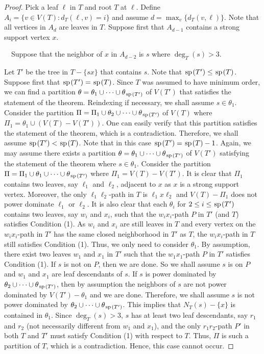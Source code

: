 \documentclass[11pt]{article}
\newcommand{\spider}{\hskip1pt \textrm{sp} \hskip1pt}
\begin{document}
\begin{proof}
Pick a leaf $\ell$ in $T$ and root $T$ at $\ell$. Define $A_i = \{v\in V(T): d_T(\ell, v) = i\}$ and assume $d= \max_v\{d_T(v, \ell)\}$. Note that all vertices in $A_d$ are leaves in $T$. Suppose first that $A_{d-1}$ contains a strong support vertex $x$.

\medskip

 \ \ Suppose that the neighbor of $x$ in $A_{d-2}$ is $s$ where $\deg_T(s) >3$.

\medskip

 Let $T'$ be the tree in $T- \{sx\}$ that contains $s$.  Note that $\spider(T') \le \spider (T)$. Suppose first that $\spider(T') = \spider(T)$. Since $T$ was assumed to have minimum order, we can find a partition $\theta=\theta_1\cup \cdots \cup \theta_{\spider(T')}$ of $V(T')$ that satisfies the statement of the theorem. Reindexing if necessary, we shall assume $s \in \theta_1$. Consider the partition $\Pi = \Pi_1 \cup \theta_2 \cup \cdots \cup \theta_{\spider(T')}$ of $V(T)$ where $\Pi_1 = \theta_1 \cup (V(T)- V(T'))$. One can easily verify that this partition satisfies the statement of the theorem, which is a contradiction. Therefore, we shall assume $\spider(T') < \spider(T)$. Note that in this case $\spider(T') = \spider(T)-1$. Again, we may assume there exists a partition $\theta = \theta_1 \cup \cdots \cup \theta_{\spider(T')}$ of $V(T')$ satisfying the statement of the theorem where $s \in \theta_1$. Consider the partition $\Pi=\Pi_1 \cup \theta_1 \cup \cdots \cup \theta_{\spider(T')}$ where $\Pi_1 = V(T) - V(T')$. It is clear that $\Pi_1$ contains two leaves, say $\ell_1$ and $\ell_2$, adjacent to $x$ as $x$ is a strong support vertex. Moreover, the only $\ell_1\ell_2$-path  in $T$ is $\ell_1x\ell_2$ and $V(T) - \Pi_1$ does not power dominate $\ell_1$ or $\ell_2$. It is also clear that each $\theta_i$ for $2 \le i \le \spider(T')$ contains two leaves, say $w_i$ and $x_i$, such that the $w_ix_i$-path $P$ in $T'$ (and $T$) satisfies Condition (1). As $w_i$ and $x_i$ are still leaves in $T$ and every vertex on the $w_ix_i$-path in $T'$ has the same closed neighborhood in $T'$ as $T$, the $w_ix_i$-path in $T$ still satisfies Condition (1). Thus, we only need to consider $\theta_1$.  By assumption, there exist two leaves $w_1$ and $x_1$ in $T'$ such that the $w_1x_1$-path $P$ in $T'$ satisfies Condition (1). If $s$ is not on $P$, then we are done. So we shall assume $s$ is on $P$ and $w_1$ and $x_1$ are leaf descendants of $s$. If $s$ is power dominated by $\theta_2 \cup \cdots \cup \theta_{\spider(T')}$, then by assumption the neighbors of $s$ are not power dominated by $V(T') - \theta_1$ and we are done. Therefore, we shall assume $s$ is not power dominated by $\theta_2 \cup \cdots \cup \theta_{\spider(T')}$. This implies that $N_T(s) - \{x\}$ is contained in $\theta_1$. Since $\deg_T(s) > 3$, $s$ has at least two leaf descendants, say $r_1$ and $r_2$ (not necessarily different from $w_1$ and $x_1$), and the only $r_1r_2$-path $P'$ in both $T$ and $T'$ must satisfy Condition (1) with respect to $T$. Thus, $\Pi$ is such a partition of $T$, which is a contradiction. Hence, this case cannot occur. 


\end{proof}
\end{document}

